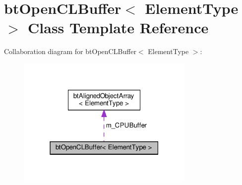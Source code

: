 \hypertarget{classbtOpenCLBuffer}{}\section{bt\+Open\+C\+L\+Buffer$<$ Element\+Type $>$ Class Template Reference}
\label{classbtOpenCLBuffer}


Collaboration diagram for bt\+Open\+C\+L\+Buffer$<$ Element\+Type $>$\+:
\nopagebreak
\begin{figure}[H]
\begin{center}
\leavevmode
\includegraphics[width=243pt]{classbtOpenCLBuffer__coll__graph}
\end{center}
\end{figure}
